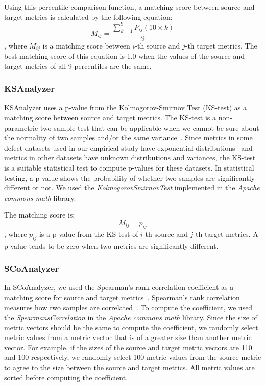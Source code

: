 Using this percentile comparison function, a matching score between source
and target metrics is calculated by the following equation:
\begin{equation}
M_{ij}=\frac{\sum\limits_{k=1}^9
P_{ij}(10\times{k})}{9}\end{equation}
, where $M_{ij}$ is a matching score between $i$-th source and $j$-th
target metrics. The best matching score of this equation is 1.0
when the values of the source and target metrics of all 9 percentiles are the
same.

\subsubsection{KSAnalyzer}
KSAnalyzer uses a p-value from the Kolmogorov-Smirnov Test (KS-test)
as a matching score between source and target metrics. The KS-test is a
non-parametric two sample test that can be applicable when we cannot be sure
about the normality of two samples and/or the same
variance~\cite{Lilliefors67,Massey51}. Since metrics in some defect datasets
used in our empirical study have exponential distributions~\cite{Menzies07} and
metrics in other datasets have unknown distributions and variances, the KS-test
is a suitable statistical test to compute p-values for these datasets. In statistical testing, a p-value shows the
probability of whether two samples are significantly different or not. We used
the {\em KolmogorovSmirnovTest} implemented in the {\em Apache commons math}
library.


The matching score is:
\begin{equation}M_{ij}=p_{ij}\end{equation}
, where $p_{ij}$ is a p-value from the KS-test of $i$-th source and $j$-th
target metrics. A p-value tends to be zero when two metrics are significantly
different.

\subsubsection{SCoAnalyzer}
In SCoAnalyzer, we used the Spearman's
rank correlation coefficient as a matching score for source and target
metrics~\cite{Spearman10}.
Spearman's rank correlation measures how two samples
are correlated~\cite{Spearman10}. To compute the coefficient, we used the
{\em SpearmansCorrelation} in the {\em Apache commons math} library. Since the
size of metric vectors should be the same to compute the coefficient, we
randomly select metric values from a metric vector that is of a greater size
than another metric vector. For example, if the sizes of the source and target metric
vectors are 110 and 100 respectively, we randomly select 100 metric values from the
source metric to agree to the size between the source and target metrics. All
metric values are sorted before computing the coefficient.

